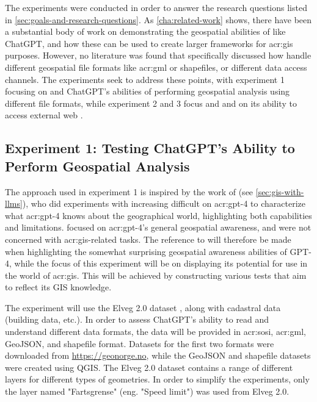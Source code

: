 The experiments were conducted in order to answer the research questions listed in \autoref{sec:goals-and-research-questions}. As \autoref{cha:related-work} shows, there have been a substantial body of work on demonstrating the geospatial abilities of  like ChatGPT, and how these can be used to create larger frameworks for \acrshort{acr:gis} purposes. However, no literature was found that specifically discussed how  handle different geospatial file formats like \acrshort{acr:gml} or shapefiles, or different data access channels. The experiments seek to address these points, with experiment 1 focusing on  and ChatGPT's abilities of performing geospatial analysis using different file formats, while experiment 2 and 3 focus  and  and on its ability to access external web .

\subsection{Experiment 1: Testing ChatGPT's Ability to Perform Geospatial Analysis}

The approach used in experiment 1 is inspired by the work of \cite{robertsGPT4GEOHowLanguage2023} (see \autoref{sec:gis-with-llms}), who did experiments with increasing difficult on \acrshort{acr:gpt}-4 to characterize what \acrshort{acr:gpt}-4 knows about the geographical world, highlighting both capabilities and limitations. \citeauthor{robertsGPT4GEOHowLanguage2023} focused on \acrshort{acr:gpt}-4's general geospatial awareness, and were not concerned with \acrshort{acr:gis}-related tasks. The reference to \cite{robertsGPT4GEOHowLanguage2023} will therefore be made when highlighting the somewhat surprising geospatial awareness abilities of GPT-4, while the focus of this experiment will be on displaying its potential for use in the world of \acrshort{acr:gis}. This will be achieved by constructing various tests that aim to reflect its GIS knowledge.

The experiment will use the Elveg 2.0 dataset \citep{thenorwegianmappingauthorityElveg2019}, along with cadastral data (building data, etc.). In order to assess ChatGPT's ability to read and understand different data formats, the data will be provided in \acrshort{acr:sosi}, \acrshort{acr:gml}, GeoJSON, and shapefile format. Datasets for the first two formats were downloaded from \url{https://geonorge.no}, while the GeoJSON and shapefile datasets were created using QGIS. The Elveg 2.0 dataset contains a range of different layers for different types of geometries. In order to simplify the experiments, only the layer named "Fartsgrense" (eng. "Speed limit") was used from Elveg 2.0.

